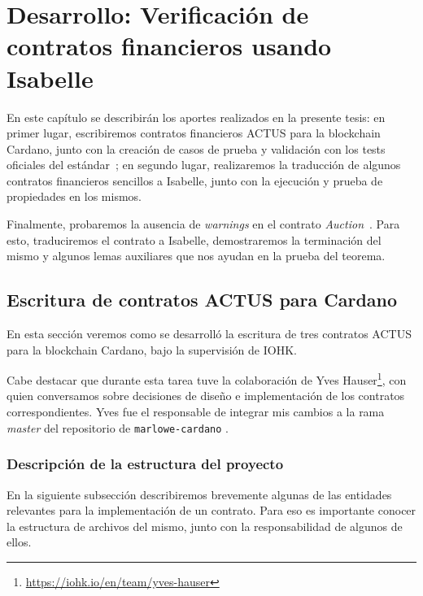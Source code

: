 \documentclass[12pt]{book}
\begin{document}
\chapter[Verificación de contratos financieros en Isabelle]{Desarrollo: Verificación de contratos financieros usando Isabelle}
 
En este capítulo se describirán los aportes realizados en la presente tesis: en primer lugar, escribiremos contratos financieros ACTUS para la blockchain Cardano, junto con la creación de casos de prueba y validación con los tests oficiales del estándar~\cite{ACTUS_Tests}; en segundo lugar, realizaremos la traducción de algunos contratos financieros sencillos a Isabelle, junto con la ejecución y prueba de propiedades en los mismos.

Finalmente, probaremos la ausencia de \textit{warnings} en el contrato \textit{Auction}~\cite{auction_haskell}. Para esto, traduciremos el contrato a Isabelle, demostraremos la terminación del mismo y algunos lemas auxiliares que nos ayudan en la prueba del teorema.

\section{Escritura de contratos ACTUS para Cardano}

En esta sección veremos como se desarrolló la escritura de tres contratos ACTUS para la blockchain Cardano, bajo la supervisión de IOHK.\@

Cabe destacar que durante esta tarea tuve la colaboración de Yves Hauser\footnote{\url{https://iohk.io/en/team/yves-hauser}}, con quien conversamos sobre decisiones de diseño e implementación de los contratos correspondientes. Yves fue el responsable de integrar mis cambios a la rama \textit{master} del repositorio de \texttt{marlowe-cardano} \cite{marlowe-cardano-github}. %

\newpage
\subsection{Descripción de la estructura del proyecto}\label{ssec:estructura}

En la siguiente subsección describiremos brevemente algunas de las entidades relevantes para la implementación de un contrato. Para eso es importante conocer la estructura de archivos del mismo, junto con la responsabilidad de algunos de ellos.
\end{document}
